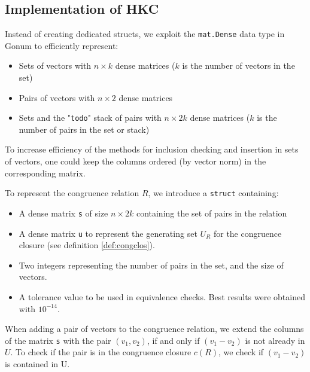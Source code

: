 \subsection{Implementation of HKC}
Instead of creating dedicated structs,
we exploit the \texttt{mat.Dense} data type in Gonum to efficiently represent:
\begin{itemize}
    \item Sets of vectors with $n \times k$ dense matrices ($k$ is the number of vectors in the set)
    \item Pairs of vectors with $n \times 2$ dense matrices
    \item Sets and the "\texttt{todo}" stack of pairs with $n \times 2k$ dense matrices ($k$ is the number of pairs in the set or stack)
\end{itemize}

To increase efficiency of the methods for inclusion checking and insertion in sets of vectors,
one could keep the columns ordered (by vector norm) in the corresponding matrix. 

To represent the congruence relation $R$, we introduce a \texttt{struct} containing:
\begin{itemize}
    \item A dense matrix \texttt{s} of size $n \times 2k$ containing the set of pairs in the relation
    \item A dense matrix \texttt{u} to represent the generating set $U_R$ for the congruence closure (see definition \ref{def:congclos}).
    \item Two integers representing the number of pairs in the set, and the size of vectors.
    \item A tolerance value to be used in equivalence checks. Best results were obtained with $10^{-14}$.
\end{itemize}

When adding a pair of vectors to the congruence relation, we extend the columns
of the matrix \texttt{s} with the pair $(v_1, v_2)$, if and only if $(v_1 - v_2)$ 
is not already in $U$. To check if the pair is in the congruence closure $c(R)$, 
we check if $(v_1 - v_2)$ is contained in U.





